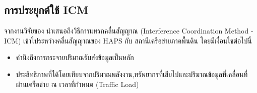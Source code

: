 \subsection{การประยุกต์ใช้ ICM}

จากงานวิจัยของ \cite[Interference Coordination Method for Integrated HAPS-Terrestrial Networks]{liu2021interference}
นำเสนอถึงวิธีการแทรกคลื่นสัญญาณ (Interference Coordination Method - ICM) เข้าไประหว่างคลื่นสัญญาณของ HAPS กับ สถานีเครือข่ายภาคพื้นดิน โดยมีเงื่อนไขต่อไปนี้
\begin{itemize}
    \item คำนึงถึงการกระจายปริมาณรับส่งข้อมูลเป็นหลัก 
    \item ประสิทธิภาพที่ได้โดยเทียบจากปริมาณพลังงาน,ทรัพยากรที่เสียไปและปริมาณข้อมูลที่เคลื่อนที่ผ่านเครือข่าย ณ เวลาที่กำหนด (Traffic Load)
\end{itemize}
